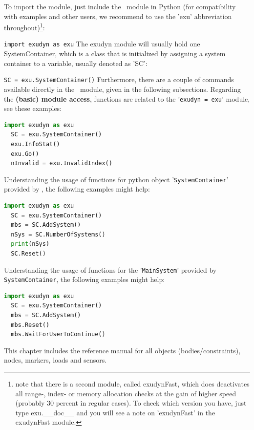 \documentclass[11pt,a4paper]{book} %
\begin{document}
To import the module, just include the \codeName\ module in Python (for compatibility with examples and other users, we recommend to use the 'exu' abbreviation throughout)\footnote{note that there is a second module, called exudynFast, which does deactivates all range-, index- or memory allocation checks at the gain of higher speed (probably 30 percent in regular cases). To check which version you have, just type exu.\_\_doc\_\_ and you will see a note on 'exudynFast' in the exudynFast module.}:
\bi
  \item[] \texttt{import exudyn as exu}
\ei
The exudyn module will usually hold one SystemContainer, which is a class that is initialized by assigning a system container to a variable, usually denoted as 'SC':
\bi
  \item[] \texttt{SC = exu.SystemContainer()}
\ei
Furthermore, there are a couple of commands available directly in the \codeName\ module, given in the following subsections.
Regarding the {\bf (basic) module access}, functions are related to the '\texttt{exudyn = exu}' module, see these examples:
\begin{lstlisting}[language=Python, firstnumber=14]
  import exudyn as exu
  SC = exu.SystemContainer()
  exu.InfoStat() 
  exu.Go()
  nInvalid = exu.InvalidIndex()
\end{lstlisting} \vspace{12pt}
%
Understanding the usage of functions for python object '\texttt{SystemContainer}' provided by \codeName, the following examples might help:
\begin{lstlisting}[language=Python, firstnumber=14]
  import exudyn as exu
  SC = exu.SystemContainer()
  mbs = SC.AddSystem()
  nSys = SC.NumberOfSystems()
  print(nSys)
  SC.Reset()
\end{lstlisting} \vspace{12pt}
%
Understanding the usage of functions for the '\texttt{MainSystem}' provided by \texttt{SystemContainer}, the following examples might help:
\begin{lstlisting}[language=Python, firstnumber=14]
  import exudyn as exu
  SC = exu.SystemContainer()
  mbs = SC.AddSystem()
  mbs.Reset()
  mbs.WaitForUserToContinue() 
\end{lstlisting} \vspace{12pt}
%




 \label{sec_item_reference_manual}
This chapter includes the reference manual for all objects (bodies/constraints), nodes, markers, loads and sensors.
\end{document}
